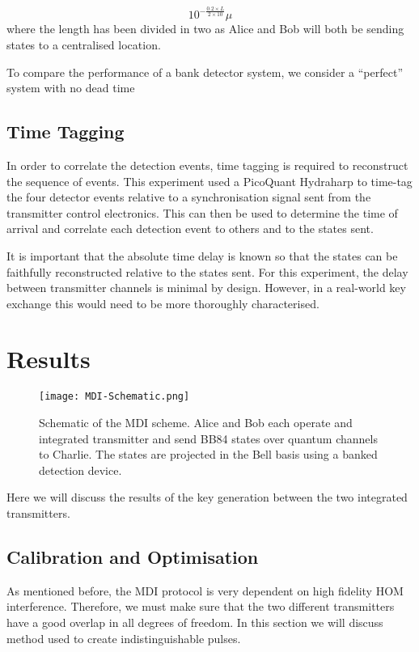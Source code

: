 \begin{equation}
	10^{-\frac{0.2 \times L}{2 \times 10}} \mu
\end{equation}
where the length has been divided in two as Alice and Bob will both be sending states to a centralised location. 

To compare the performance of a bank detector system, we consider a ``perfect'' system with no dead time

\subsection{Time Tagging}

In order to correlate the detection events, time tagging is required to reconstruct the sequence of events. This experiment used a PicoQuant Hydraharp to time-tag the four detector events relative to a synchronisation signal sent from the transmitter control electronics. This can then be used to determine the time of arrival and correlate each detection event to others and to the states sent.

It is important that the absolute time delay is known so that the states can be faithfully reconstructed relative to the states sent. For this experiment, the delay between transmitter channels is minimal by design. However, in a real-world key exchange this would need to be more thoroughly characterised. 

\section{Results}

\begin{figure}[tp]
	\centering
	\texttt{[image: MDI-Schematic.png]}
	\caption[Chip-based MDI-QKD experimental schematic]{Schematic of the \ac{MDI} scheme. Alice and Bob each operate and integrated transmitter and send BB84 states over quantum channels to Charlie. The states are projected in the Bell basis using a banked detection device.}
	\label{fig:mdi-schem}
\end{figure}

Here we will discuss the results of the key generation between the two integrated transmitters.

\subsection{Calibration and Optimisation}

As mentioned before, the \ac{MDI} protocol is very dependent on high fidelity \ac{HOM} interference. Therefore, we must make sure that the two different transmitters have a good overlap in all degrees of freedom. In this section we will discuss method used to create indistinguishable pulses.

